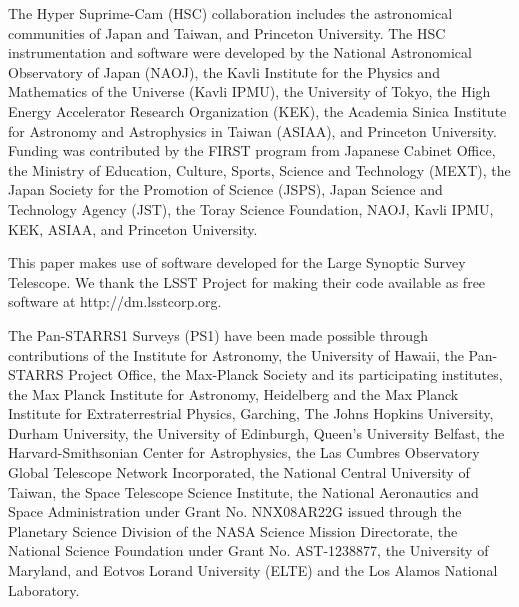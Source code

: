 \documentclass[useamsfonts]{pasj01}
\begin{document}
\begin{ack}
    \label{sec:ack}

    The Hyper Suprime-Cam (HSC) collaboration includes the astronomical communities of
    Japan and Taiwan, and Princeton University.
    The HSC instrumentation and software were developed by the National Astronomical
    Observatory of Japan (NAOJ), the Kavli Institute for the Physics and Mathematics of
    the Universe (Kavli IPMU), the University of Tokyo, the High Energy Accelerator
    Research Organization (KEK), the Academia Sinica Institute for Astronomy and
    Astrophysics in Taiwan (ASIAA), and Princeton University.
    Funding was contributed by the FIRST program from Japanese Cabinet Office, the
    Ministry of Education, Culture, Sports, Science and Technology (MEXT), the Japan
    Society for the Promotion of Science (JSPS), Japan Science and Technology Agency
    (JST), the Toray Science  Foundation, NAOJ, Kavli IPMU, KEK, ASIAA, and Princeton
    University.

    This paper makes use of software developed for the Large Synoptic Survey Telescope.
    We thank the LSST Project for making their code available as free software at
    http://dm.lsstcorp.org.

    The Pan-STARRS1 Surveys (PS1) have been made possible through contributions of the
    Institute for Astronomy, the University of Hawaii, the Pan-STARRS Project Office,
    the Max-Planck Society and its participating institutes, the Max Planck Institute
    for Astronomy, Heidelberg and the Max Planck Institute for Extraterrestrial Physics,
    Garching, The Johns Hopkins University, Durham University, the University of
    Edinburgh, Queen's University Belfast, the Harvard-Smithsonian Center for Astrophysics,
    the Las Cumbres Observatory Global Telescope Network Incorporated, the National
    Central University of Taiwan, the Space Telescope Science Institute, the National
    Aeronautics and Space Administration under Grant No.
    NNX08AR22G issued through the Planetary Science Division of the NASA Science
    Mission Directorate, the National Science Foundation under Grant No. AST-1238877,
    the University of Maryland, and Eotvos Lorand University (ELTE) and the Los Alamos
    National Laboratory.


\end{ack}
\end{document}
